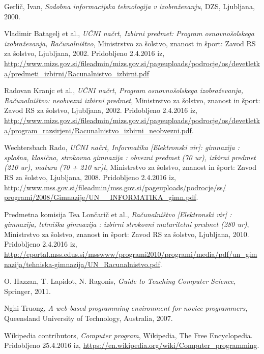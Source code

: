 \begin{thebibliography}{100}

 Gerlič, Ivan, \emph{Sodobna informacijska tehnologija v
    izobraževanju}, DZS, Ljubljana, 2000.

 Vladimir Batagelj et al., \emph{UČNI
    načrt, Izbirni predmet: Program osnovnošolskega izobraževanja,
    Računalništvo}, Ministrstvo za šolstvo, znanost in šport: Zavod RS
  za šolstvo, Ljubljana, 2002. Pridobljeno 2.4.2016 iz,
  \url{http://www.mizs.gov.si/fileadmin/mizs.gov.si/pageuploads/podrocje/os/devetletka/predmeti_izbirni/Racunalnistvo_izbirni.pdf}

 Radovan Kranjc et al., \emph{UČNI
    načrt, Program osnovnošolskega izobraževanja, Računalništvo:
    neobvezni izbirni predmet}, Ministrstvo za šolstvo, znanost in
  šport: Zavod RS za šolstvo, Ljubljana, 2002. Pridobljeno 2.4.2016
  iz,
  \url{http://www.mizs.gov.si/fileadmin/mizs.gov.si/pageuploads/podrocje/os/devetletka/program_razsirjeni/Racunalnistvo_izbirni_neobvezni.pdf}.

 Wechtersbach Rado, \emph{UČNI
    načrt, Informatika [Elektronski vir]: gimnazija : splošna,
    klasična, strokovna gimnazija : obvezni predmet (70 ur), izbirni
    predmet (210 ur), matura (70 + 210 ur)t}, Ministrstvo za šolstvo,
  znanost in šport: Zavod RS za šolstvo, Ljubljana, 2008. Pridobljeno
  2.4.2016 iz,
  \url{http://www.mss.gov.si/fileadmin/mss.gov.si/pageuploads/podrocje/ss/ programi/2008/Gimnazije/UN__INFORMATIKA_gimn.pdf}.

 Predmetna komisija Tea Lončarič et al.,
  \emph{Računalništvo [Elektronski vir] : gimnazija, tehniška
    gimnazija : izbirni strokovni maturitetni predmet (280 ur)},
  Ministrstvo za šolstvo, znanost in šport: Zavod RS za šolstvo,
  Ljubljana, 2010. Pridobljeno 2.4.2016 iz,
  \url{http://eportal.mss.edus.si/msswww/programi2010/programi/media/pdf/un_gimnazija/tehniska-gimnazija/UN_Racunalnistvo.pdf}.

 O. Hazzan, T. Lapidot, N. Ragonis,
  \emph{Guide to Teaching Computer Science}, Springer, 2011.

 Nghi Truong,
  \emph{A web-based programming environment for novice programmers},
  Queensland University of Technology, Australia, 2007.

 Wikipedia contributors, \emph{Computer
    program}, Wikipedia, The Free Encyclopedia. Pridobljeno 25.4.2016
  iz,
  \url{https://en.wikipedia.org/wiki/Computer_programming}.


\end{thebibliography}
